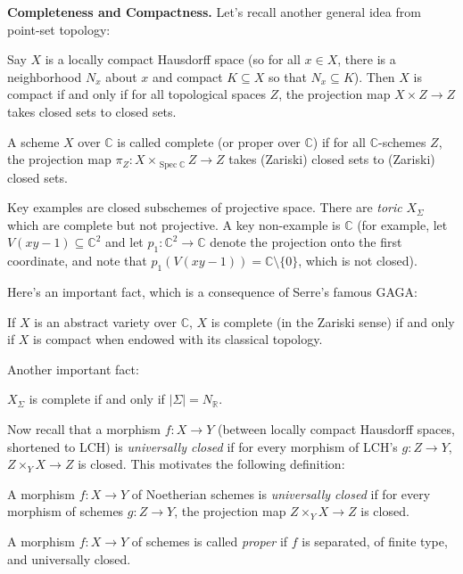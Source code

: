 \documentclass[a4paper,12pt]{amsart}
\newcommand{\C}{\ensuremath{\mathbb{C}}}
\newcommand{\R}{\ensuremath{\mathbb{R}}}
\DeclareMathOperator{\Spec}{Spec}
\begin{document}
\noindent \textbf{Completeness and Compactness.}
Let's recall another general idea from point-set topology:
\begin{Lemma}
    Say $X$ is a locally compact Hausdorff space (so for all $x \in X$, there is a neighborhood $N_x$ about $x$ and compact $K \subseteq X$ so that $N_x \subseteq K$). Then $X$ is compact if and only if for all topological spaces $Z$, the projection map $X \times Z \to Z$ takes closed sets to closed sets.
\end{Lemma}
\begin{definition}
A scheme $X$ over $\C$ is called complete (or proper over $\C$) if for all $\C$-schemes $Z$, the projection map $\pi_Z : X \times_{\Spec \C} Z \to Z$ takes (Zariski) closed sets to (Zariski) closed sets.
\end{definition}
\begin{example}
Key examples are closed subschemes of projective space. There are \emph{toric} $X_\Sigma$ which are complete but not projective. A key non-example is $\C$ (for example, let $V(xy - 1) \subseteq \C^2$ and let $p_1: \C^2 \to \C$ denote the projection onto the first coordinate, and note that $p_1(V(xy-1)) = \C \setminus \{0\}$, which is not closed). 
\end{example}
\noindent Here's an important fact, which is a consequence of Serre's famous GAGA:
\begin{theorem}
    If $X$ is an abstract variety over $\C$, $X$ is complete (in the Zariski sense) if and only if $X$ is compact when endowed with its classical topology.
\end{theorem}
\noindent Another important fact:
\begin{theorem}
$X_\Sigma$ is complete if and only if $|\Sigma| = N_\R$.
\end{theorem}
\noindent Now recall that a morphism $f: X \to Y$ (between locally compact Hausdorff spaces, shortened to LCH) is \emph{universally closed} if for every morphism of LCH's $g: Z \to Y$, $Z \times_Y X \to Z$ is closed. This motivates the following definition:
\begin{definition}
A morphism $f: X \to Y$ of Noetherian schemes is \emph{universally closed} if for every morphism of schemes $g: Z \to Y$, the projection map $Z \times_Y X \to Z$ is closed.
\end{definition}
\begin{definition}
A morphism $f: X \to Y$ of schemes is called \emph{proper} if $f$ is separated, of finite type, and universally closed.
\end{definition}
\end{document}

